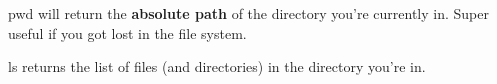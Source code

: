 \begin{frame}

	\begin{block}{pwd}
		 will return the \textbf{absolute path} of the directory you're currently in. Super useful if you got lost in the file system.
	\end{block}
	
	\begin{block}{ls}
		returns the list of files (and directories) in the directory you're in.
	\end{block}

\end{frame}



